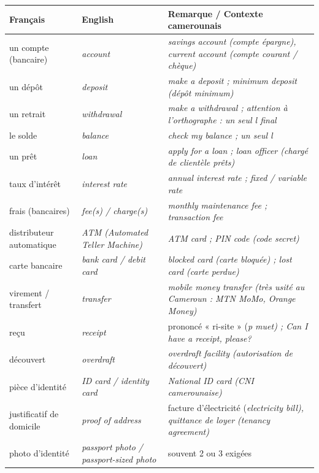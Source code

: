 \documentclass[11pt]{article}
\newcommand{\eng}[1]{\ifmmode\text{\textit{#1}}\else\begingroup\selectlanguage{english}\itshape #1\endgroup\fi}
\begin{document}
\begin{propriete}
\begin{center}
\begin{tabularx}{\linewidth}{|X|X|X|}
\hline
\rowcolor{popblueL} \textbf{Français} & \textbf{English} & \textbf{Remarque / Contexte camerounais} \\
\hline
un compte (bancaire) & \eng{account} & \eng{savings account} (compte épargne), \eng{current account} (compte courant / chèque) \\
\hline
un dépôt & \eng{deposit} & \eng{make a deposit} ; \eng{minimum deposit} (dépôt minimum) \\
\hline
un retrait & \eng{withdrawal} & \eng{make a withdrawal} ; attention à l'orthographe : un seul \eng{l} final \\
\hline
le solde & \eng{balance} & \eng{check my balance} ; un seul \eng{l} \\
\hline
un prêt & \eng{loan} & \eng{apply for a loan} ; \eng{loan officer} (chargé de clientèle prêts) \\
\hline
taux d'intérêt & \eng{interest rate} & \eng{annual interest rate} ; \eng{fixed / variable rate} \\
\hline
frais (bancaires) & \eng{fee(s)} / \eng{charge(s)} & \eng{monthly maintenance fee} ; \eng{transaction fee} \\
\hline
distributeur automatique & \eng{ATM} (Automated Teller Machine) & \eng{ATM card} ; \eng{PIN code} (code secret) \\
\hline
carte bancaire & \eng{bank card} / \eng{debit card} & \eng{blocked card} (carte bloquée) ; \eng{lost card} (carte perdue) \\
\hline
virement / transfert & \eng{transfer} & \eng{mobile money transfer} (très usité au Cameroun : MTN MoMo, Orange Money) \\
\hline
reçu & \eng{receipt} & prononcé « ri-site » (\eng{p} muet) ; \eng{Can I have a receipt, please?} \\
\hline
découvert & \eng{overdraft} & \eng{overdraft facility} (autorisation de découvert) \\
\hline
pièce d'identité & \eng{ID card} / \eng{identity card} & \eng{National ID card} (CNI camerounaise) \\
\hline
justificatif de domicile & \eng{proof of address} & facture d'électricité (\eng{electricity bill}), quittance de loyer (\eng{tenancy agreement}) \\
\hline
photo d'identité & \eng{passport photo} / \eng{passport-sized photo} & souvent 2 ou 3 exigées \\

\end{tabularx}
\end{center}
\end{propriete}
\end{document}
